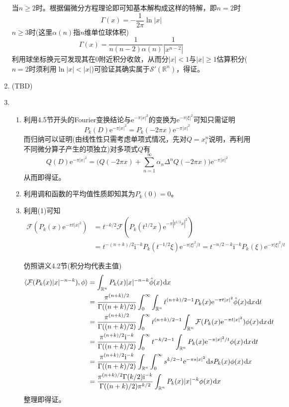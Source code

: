 \documentclass[a4paper,UTF8,fontset=windows]{ctexart}
\newcommand*{\er}{\mathrm{e}}
\newcommand*{\ir}{\mathrm{i}}
\newcommand*{\dr}{\hspace{0.07em}\mathrm{d}}
\begin{document}
\begin{enumerate}
    当$n\ge2$时。根据偏微分方程理论即可知基本解构成这样的特解，即$n=2$时
    $$\Gamma(x)=-\frac{1}{2\pi}\ln|x|$$
    $n\ge3$时(这里$\alpha(n)$指$n$维单位球体积)
    $$\Gamma(x)=\frac{1}{n(n-2)\alpha(n)}\frac{1}{|x^{n-2}|}$$
    利用球坐标换元可发现其在0附近积分收敛，从而分$|x|<1$与$|x|\ge1$估算积分($n=2$时须利用$\ln|x|<|x|$)可验证其确实属于$\mathcal{S}'(\mathbb{R}^n)$，得证。
    
    \item (TBD)
    \item 
    \begin{enumerate}[(1)]
        \item 利用4.5节开头的Fourier变换结论与$\er^{-\pi|x|^2}$的变换为$\er^{-\pi|\xi|^2}$可知只需证明
        $$P_k(D)\er^{-\pi|x|^2}=P_k(-2\pi x)\er^{-\pi|x|^2}$$
        而归纳可以证明(由线性性只需考虑单项式情况，先对$Q=x_i^n$说明，再利用不同微分算子产生的项独立)对多项式$Q$有
        $$Q(D)\er^{-\pi|x|^2}=\bigg(Q(-2\pi x)+\sum_{n=1}^\infty\alpha_n\Delta^n Q(-2\pi x)\bigg)\er^{-\pi|x|^2}$$
        从而即得证。

        \item 利用调和函数的平均值性质即知其为$P_k(0)=0$。
        
        \item 
        利用(1)可知
        $$\begin{aligned}\mathcal{F}(P_k(x)\er^{-\pi t|x|^2})&=t^{-k/2}\mathcal{F}(P_k(t^{1/2}x)\er^{-\pi|t^{1/2}x|^2})\\ &=t^{-(n+k)/2}\ir^{-k}P_k(t^{-1/2}\xi)\er^{-\pi|\xi|^2/t}=t^{-n/2-k}\ir^{-k}P_k(\xi)\er^{-\pi|\xi|^2/t}\end{aligned}$$
        
        仿照讲义4.2节(积分均代表主值)
        $$\begin{aligned}\langle \mathcal{F}(P_k(x)|x|^{-n-k}),\phi\rangle &=\int_{\mathbb{R}^n}P_k(x)|x|^{-n-k}\hat{\phi}(x)\dr x\\ &=\frac{\pi^{(n+k)/2}}{\Gamma((n+k)/2)}\int_0^\infty \int_{\mathbb{R}^n}t^{(n+k)/2-1}P_k(x)\er^{-\pi t|x|^2}\hat{\phi}(x)\dr x\dr t\\ &=\frac{\pi^{(n+k)/2}}{\Gamma((n+k)/2)}\int_0^\infty t^{(n+k)/2-1}\int_{\mathbb{R}^n}\mathcal{F}(P_k(x)\er^{-\pi t|x|^2})\phi(x)\dr x\dr t\\ &=\frac{\pi^{(n+k)/2}\ir^{-k}}{\Gamma((n+k)/2)}\int_0^\infty t^{-k/2-1}\int_{\mathbb{R}^n}P_k(x)\er^{-\pi|x|^2/t}\phi(x)\dr x\dr t\\ &=\frac{\pi^{(n+k)/2}\ir^{-k}}{\Gamma((n+k)/2)}\int_{\mathbb{R}^n}\int_0^\infty s^{k/2-1}\er^{-\pi s|x|^2}\dr s P_k(x)\phi(x)\dr x\\ &=\frac{\pi^{(n+k)/2}\Gamma(k/2)\ir^{-k}}{\Gamma((n+k)/2)\pi^{k/2}}\int_{\mathbb{R}^n}P_k(x)|x|^{-k}\phi(x)\dr x\end{aligned}$$
        整理即得证。
    \end{enumerate}
\end{enumerate}
\end{document}
